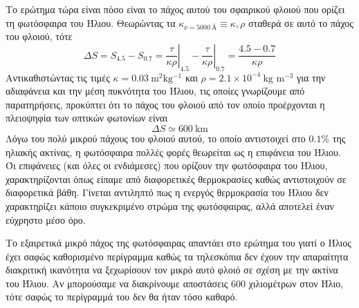 Το ερώτημα τώρα είναι πόσο είναι το πάχος αυτού του σφαιρικού φλοιού που ορίζει τη φωτόσφαιρα του Ήλιου.
Θεωρώντας τα $\kappa_{\nu=5000 \ \text{\AA}} \equiv \kappa, \rho$ σταθερά σε αυτό το πάχος του φλοιού, τότε
$$\Delta S = S_{4.5} - S_{0.7} = \left. \frac{\tau}{\kappa \rho} \right|_{4.5} - \left. \frac{\tau}{\kappa \rho} \right|_{0.7} = \frac{4.5 - 0.7}{\kappa \rho} $$
Αντικαθιστώντας τις τιμές $\kappa = 0.03 \ \text{m$^2 $kg$^{-1}$}$ και $\rho = 2.1 \times 10^{-4} \ \text{kg m$^{-3}$}$ για την αδιαφάνεια και την μέση πυκνότητα του Ήλιου, τις οποίες γνωρίζουμε από παρατηρήσεις, προκύπτει ότι το πάχος του φλοιού από τον οποίο προέρχονται η πλειοψηφία των οπτικών φωτονίων είναι $$\Delta S \simeq 600 \ \text{km}$$
Λόγω του πολύ μικρού πάχους του φλοιού αυτού, το οποίο αντιστοιχεί στο $0.1 \%$ της ηλιακής ακτίνας, η φωτόσφαιρα πολλές φορές θεωρείται ως η επιφάνεια του Ήλιου. Όι επιφάνειες (και όλες οι ενδιάμεσες) που ορίζουν την φωτόσφαιρα του Ήλιου, χαρακτηρίζονται όπως είπαμε από διαφορετικές θερμοκρασίες καθώς αντιστοιχούν σε διαφορετικά βάθη. Γίνεται αντιληπτό πως η ενεργός θερμοκρασία του Ήλιου δεν χαρακτηρίζει κάποιο συγκεκριμένο στρώμα της φωτόσφαιρας, αλλά αποτελεί έναν εύχρηστο μέσο όρο.

Το εξαιρετικά μικρό πάχος της φωτόσφαιρας απαντάει στο ερώτημα του γιατί ο Ήλιος έχει σαφώς καθορισμένο περίγραμμα καθώς τα τηλεσκόπια δεν έχουν την απαραίτητα διακριτική ικανότητα να ξεχωρίσουν τον μικρό αυτό φλοιό σε σχέση με την ακτίνα του Ήλιου. Αν μπορούσαμε να διακρίνουμε αποστάσεις 600 χιλιομέτρων στον Ήλιο, τότε σαφώς το περίγραμμά του δεν θα ήταν τόσο καθαρό.




